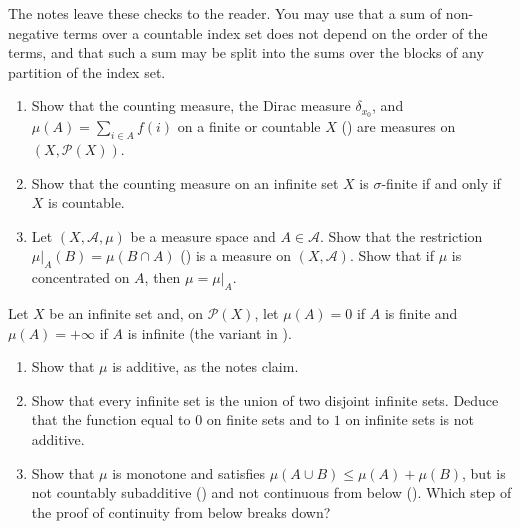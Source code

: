 
\begin{exercise}\label{ex:ms-examples-are-measures}
\easy The notes leave these checks to the reader. You may use that a sum of non-negative
terms over a countable index set does not depend on the order of the terms, and that such a
sum may be split into the sums over the blocks of any partition of the index set.
\begin{enumerate}[label=(\alph*)]
  \item Show that the counting measure, the Dirac measure $\delta_{x_0}$, and
    $\mu(A)=\sum_{i\in A}f(i)$ on a finite or countable $X$
    () are measures on $(X,\mathcal P(X))$.
  \item Show that the counting measure on an infinite set $X$ is $\sigma$-finite if and only
    if $X$ is countable.
  \item Let $(X,\mathcal A,\mu)$ be a measure space and $A\in\mathcal A$. Show that the
    restriction $\mu|_A(B)=\mu(B\cap A)$ () is a measure on
    $(X,\mathcal A)$. Show that if $\mu$ is concentrated on $A$, then $\mu=\mu|_A$.
\end{enumerate}
\end{exercise}

\begin{exercise}\label{ex:ms-infinite-sets}
\easy Let $X$ be an infinite set and, on $\mathcal P(X)$, let $\mu(A)=0$ if $A$ is finite and
$\mu(A)=+\infty$ if $A$ is infinite (the variant in ).
\begin{enumerate}[label=(\alph*)]
  \item Show that $\mu$ is additive, as the notes claim.
  \item Show that every infinite set is the union of two disjoint infinite sets. Deduce that
    the function equal to $0$ on finite sets and to $1$ on infinite sets is not additive.
  \item Show that $\mu$ is monotone and satisfies $\mu(A\cup B)\le\mu(A)+\mu(B)$, but is not
    countably subadditive () and not continuous from below
    (). Which step of the proof of continuity from below
    breaks down?
\end{enumerate}
\end{exercise}

